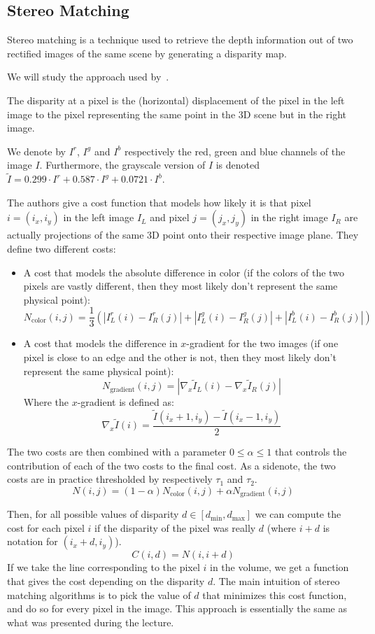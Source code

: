 \subsection{Stereo Matching}\label{subsec:stereomatching}

Stereo matching is a technique used to retrieve the depth information out of two rectified images of the same scene by
generating a disparity map.

We will study the approach used by~\citep{stereomatching}.

The disparity at a pixel is the (horizontal) displacement of the pixel in the left image to the pixel representing the
same point in the 3D scene but in the right image.

We denote by $I^r$, $I^g$ and $I^b$ respectively the red, green and blue channels of the image $I$.
Furthermore, the grayscale version of $I$ is denoted $\tilde{I}=0.299\cdot I^r+0.587\cdot I^g+0.0721\cdot I^b$.

The authors give a cost function that models how likely it is that pixel $i=(i_x,i_y)$ in the left image $I_L$ and
pixel $j=(j_x,j_y)$ in the right image $I_R$ are actually projections of the same 3D point onto their respective image
plane.
They define two different costs:
\begin{itemize}
    \item A cost that models the absolute difference in color (if the colors of the two pixels are vastly different, then
    they most likely don't represent the same physical point):
    \[N_{\text{color}}(i,j)=\frac{1}{3}\left(|I_L^r(i)-I_R^r(j)|+|I_L^g(i)-I_R^g(j)|+|I_L^b(i)-I_R^b(j)|\right)\]
    \item A cost that models the difference in $x$-gradient for the two images (if one pixel is close to an edge and
    the other is not, then they most likely don't represent the same physical point):
    \[N_{\text{gradient}}(i,j)=|\nabla_x \tilde{I}_L(i)-\nabla_x \tilde{I}_R(j)|\]
    Where the $x$-gradient is defined as:
    \[\nabla_x\tilde{I}(i)=\frac{\tilde{I}(i_x+1,i_y)-\tilde{I}(i_x-1,i_y)}{2}\]
\end{itemize}
The two costs are then combined with a parameter $0\leq \alpha\leq 1$ that controls the contribution of each of the two
costs to the final cost.
As a sidenote, the two costs are in practice thresholded by respectively $\tau_1$ and $\tau_2$.
\[N(i,j)=(1-\alpha)N_{\text{color}}(i,j)+\alpha N_{\text{gradient}}(i,j)\]

Then, for all possible values of disparity $d\in [d_{\min},d_{\max}]$ we can compute the cost for each pixel $i$ if the
disparity of the pixel was really $d$ (where $i+d$ is notation for $(i_x+d,i_y)$).
\[C(i,d)=N(i,i+d)\]
If we take the line corresponding to the pixel $i$ in the volume, we get a function that gives the cost depending on
the disparity $d$.
The main intuition of stereo matching algorithms is to pick the value of $d$ that minimizes this cost function, and do
so for every pixel in the image.
This approach is essentially the same as what was presented during the lecture.

